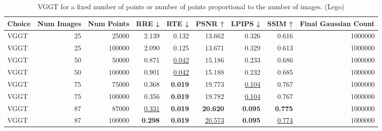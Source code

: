 \begin{table}[H]
\caption{VGGT for a fixed number of points or number of points proportional to the number of images. (Lego)}
\label{tab:01_num_images_fixed_points_lego}
\small
\begin{tabular}{lrrrrrrrr}
\toprule
Choice & Num Images & Num Points & RRE ↓ & RTE ↓ & PSNR ↑ & LPIPS ↓ & SSIM ↑ & Final Gaussian Count \\
\midrule
VGGT & 25 & 25000 & 2.139 & 0.132 & 13.662 & 0.326 & 0.616 & 1000000 \\
VGGT & 25 & 100000 & 2.090 & 0.125 & 13.671 & 0.329 & 0.613 & 1000000 \\
VGGT & 50 & 50000 & 0.871 & \underline{0.042} & 15.186 & 0.233 & 0.686 & 1000000 \\
VGGT & 50 & 100000 & 0.901 & \underline{0.042} & 15.188 & 0.232 & 0.685 & 1000000 \\
VGGT & 75 & 75000 & 0.368 & \textbf{0.019} & 19.773 & \underline{0.104} & 0.767 & 1000000 \\
VGGT & 75 & 100000 & 0.356 & \textbf{0.019} & 19.782 & \underline{0.104} & 0.767 & 1000000 \\
VGGT & 87 & 87000 & \underline{0.331} & \textbf{0.019} & \textbf{20.620} & \textbf{0.095} & \textbf{0.775} & 1000000 \\
VGGT & 87 & 100000 & \textbf{0.298} & \textbf{0.019} & \underline{20.573} & \textbf{0.095} & \underline{0.774} & 1000000 \\
\bottomrule
\end{tabular}
\end{table}
